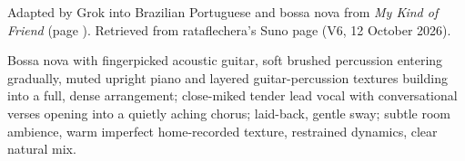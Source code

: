 
\begin{notes}
Adapted by Grok into Brazilian Portuguese and bossa nova from \emph{My Kind of Friend} (page \pageref{sec:my-kind-of-friend}). Retrieved from rataflechera's Suno page (V6, 12 October 2026).
\end{notes}
\begin{style}
Bossa nova with fingerpicked acoustic guitar, soft brushed percussion entering gradually, muted upright piano and layered guitar-percussion textures building into a full, dense arrangement; close-miked tender lead vocal with conversational verses opening into a quietly aching chorus; laid-back, gentle sway; subtle room ambience, warm imperfect home-recorded texture, restrained dynamics, clear natural mix.
\end{style}
